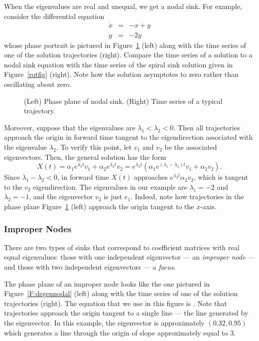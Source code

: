 \documentclass{ximera}
\begin{document}
When the eigenvalues are real and unequal, we get a nodal sink.
For example, consider the differential equation
\begin{eqnarray*}
\dot{x} & = & -x+y \\
\dot{y} & = & -2y
\end{eqnarray*}
whose phase portrait is pictured
in Figure~\ref{F:nodalsink} (left)
along with the time series of one of the solution trajectories (right).
Compare the time series of a solution to a nodal sink equation
with the time series of the spiral sink solution given in
Figure~\ref{rotfig} (right).  Note how the solution asymptotes
to zero rather than oscillating about zero.

\begin{figure}[htb]
           \centerline{%
           }
           \caption{(Left) Phase plane of nodal sink.
	(Right) Time series of a typical trajectory.}
           \label{F:nodalsink}
\end{figure}

Moreover, suppose that the eigenvalues are $\lambda_1 < \lambda_2
< 0$.  Then all trajectories approach the origin in forward time
tangent to the eigendirection associated with the eigenvalue
$\lambda_2$.   To verify this point, let $v_1$ and $v_2$ be the
associated eigenvectors.  Then, the general solution has the
form
\[
X(t) = \alpha_1e^{\lambda_1 t}v_1 + \alpha_2e^{\lambda_2 t}v_2
= e^{\lambda_2 t}(\alpha_1e^{(\lambda_1-\lambda_2)t}v_1 + \alpha_2v_2).
\]
Since $\lambda_1-\lambda_2<0$, in forward time $X(t)$ approaches
$e^{\lambda_2 t}\alpha_2v_2$, which is tangent to the $v_2$
eigendirection.  The eigenvalues in our example are $\lambda_1=-2$
and $\lambda_2=-1$, and the eigenvector $v_2$ is just $e_1$.
Indeed, note how trajectories in the phase plane  Figure~\ref{F:nodalsink}
(left) approach the origin tangent to the $x$-axis.

\subsubsection*{Improper Nodes}

There are two types of sinks that correspond to coefficient
matrices with real equal eigenvalues: those with one independent
eigenvector --- an {\em improper node\/} --- and those with two independent
eigenvectors --- a {\em focus\/}.

The phase plane
of an improper node looks like the one pictured in
Figure~\ref{F:degennodal} (left) along with the time series
of one of the solution trajectories (right).  The equation
that we use in this figure is .
Note that trajectories approach the origin tangent to a single
line --- the line generated by the eigenvector.  In this example, the
eigenvector is approximately $(0.32,0.95)$ which generates a line
through the origin of slope approximately equal to $3$.
\end{document}
